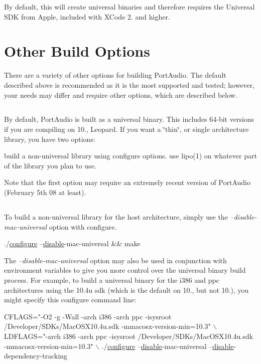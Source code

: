 By default, this will create universal binaries and therefore requires the Universal S\+DK from Apple, included with X\+Code 2. and higher.\hypertarget{compile_mac_coreaudio_comp_mac_ca_3}{}\section{Other Build Options}\label{compile_mac_coreaudio_comp_mac_ca_3}
There are a variety of other options for building Port\+Audio. The default described above is recommended as it is the most supported and tested; however, your needs may differ and require other options, which are described below.\hypertarget{_}{}\subsection{}\label{_}
By default, Port\+Audio is built as a universal binary. This includes 64-\/bit versions if you are compiling on 10., Leopard. If you want a \char`\"{}thin\char`\"{}, or single architecture library, you have two options\+:

build a non-\/universal library using configure options. use lipo(1) on whatever part of the library you plan to use.

Note that the first option may require an extremely recent version of Port\+Audio (February 5th \textquotesingle{}08 at least).\hypertarget{_}{}\subsection{}\label{_}
To build a non-\/universal library for the host architecture, simply use the {\itshape --disable-\/mac-\/universal} option with configure.


\begin{DoxyCode}
./\hyperlink{namespacewaflib_1_1extras_1_1autowaf_aed9c0237757b6bbcc7a442d726e82c47}{configure} --\hyperlink{namespacewaflib_1_1_utils_aea337018ae42240dee8d93bfeafc359b}{disable}-mac-universal && make
\end{DoxyCode}


The {\itshape --disable-\/mac-\/universal} option may also be used in conjunction with environment variables to give you more control over the universal binary build process. For example, to build a universal binary for the i386 and ppc architectures using the 10.\+4u sdk (which is the default on 10., but not 10.), you might specify this configure command line\+:


\begin{DoxyCode}
CFLAGS=\textcolor{stringliteral}{"-O2 -g -Wall -arch i386 -arch ppc -isysroot /Developer/SDKs/MacOSX10.4u.sdk
       -mmacosx-version-min=10.3"} \(\backslash\)
  LDFLAGS=\textcolor{stringliteral}{"-arch i386 -arch ppc -isysroot /Developer/SDKs/MacOSX10.4u.sdk -mmacosx-version-min=10.3"} \(\backslash\)
  ./\hyperlink{namespacewaflib_1_1extras_1_1autowaf_aed9c0237757b6bbcc7a442d726e82c47}{configure} --\hyperlink{namespacewaflib_1_1_utils_aea337018ae42240dee8d93bfeafc359b}{disable}-mac-universal --\hyperlink{namespacewaflib_1_1_utils_aea337018ae42240dee8d93bfeafc359b}{disable}-dependency-tracking
\end{DoxyCode}


